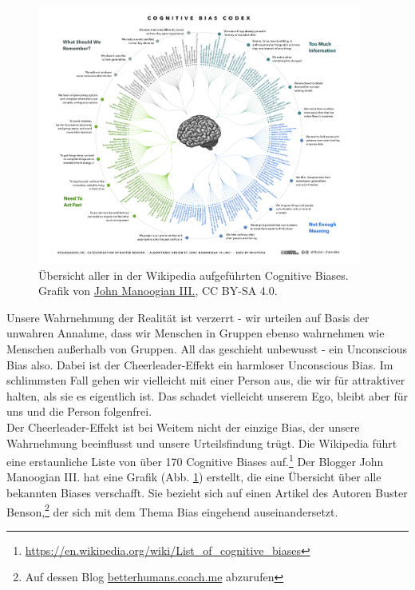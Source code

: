 \begin{figure}[htbp]
	\includegraphics[width=0.95\textwidth]{Bilder/cognitive-bias-codex.png}
	\caption{Übersicht aller in der Wikipedia aufgeführten Cognitive Biases. Grafik von \href{https://commons.wikimedia.org/w/index.php?curid=57942404}{John Manoogian III.}, CC BY-SA 4.0.}
\label{fig:cognitive-bias-codex}
\end{figure}

Unsere Wahrnehmung der Realität ist verzerrt - wir urteilen auf Basis der unwahren Annahme, dass wir Menschen in Gruppen ebenso wahrnehmen wie Menschen außerhalb von Gruppen. All das geschieht unbewusst - ein Unconscious Bias also. Dabei ist der Cheerleader-Effekt ein harmloser Unconscious Bias. Im schlimmsten Fall gehen wir vielleicht mit einer Person aus, die wir für attraktiver halten, als sie es eigentlich ist. Das schadet vielleicht unserem Ego, bleibt aber für uns und die Person folgenfrei. \\

Der Cheerleader-Effekt ist bei Weitem nicht der einzige Bias, der unsere Wahrnehmung beeinflusst und unsere Urteilsfindung trügt. Die Wikipedia führt eine erstaunliche Liste von über 170 Cognitive Biases auf.\footnote{\url{https://en.wikipedia.org/wiki/List_of_cognitive_biases}} Der Blogger John Manoogian III. hat eine Grafik (Abb. \ref{fig:cognitive-bias-codex}) erstellt, die eine Übersicht über alle bekannten Biases verschafft. Sie bezieht sich auf einen Artikel des Autoren Buster Benson,\footnote{Auf dessen Blog \href{https://betterhumans.coach.me/cognitive-bias-cheat-sheet-55a472476b18}{betterhumans.coach.me} abzurufen} der sich mit dem Thema Bias eingehend auseinandersetzt. \\

